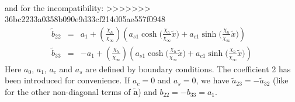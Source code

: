 \documentclass[
10pt, %
a4paper, %
oneside, %
headinclude,footinclude, %
table
]{scrartcl}
\begin{document}
\begin{itemize}
\begin{equation}
\begin{array}{rcl}
\end{array}
\end{equation}
and for the incompatibility:
>>>>>>> 36bc2233a0358b090e9d33cf214d05ae557f0948
$$
\begin{array}{rcl}
\tilde{b}_{22}&=&a_{1}+(\frac{\chi_{h}}{\chi_{\infty}})\left(a_{s1}\cosh{(\frac{\chi_{h}}{\chi_{\infty}}\tilde{x}})+a_{c1}\sinh{(\frac{\chi_{h}}{\chi_{\infty}}\tilde{x}})\right)\\
\tilde{b}_{33}&=&-a_{1}+(\frac{\chi_{h}}{\chi_{\infty}})\left(a_{s1}\cosh{(\frac{\chi_{h}}{\chi_{\infty}}\tilde{x}})+a_{c1}\sinh{(\frac{\chi_{h}}{\chi_{\infty}}\tilde{x}})\right)
\end{array}
$$
Here $a_{0}$, $a_{1}$, $a_{c}$ and $a_{s}$ are defined by boundary conditions. The coefficient 2 has been introduced for convenience.  If $a_{c}=0$ and $a_{s}=0$, we have $\tilde{a}_{23}=-\tilde{a}_{32}$ (like for the other non-diagonal terms of $\tilde{\boldsymbol{a}}$) and $b_{22}=-b_{33}=a_{1}$. 


\end{itemize}
\end{document}
